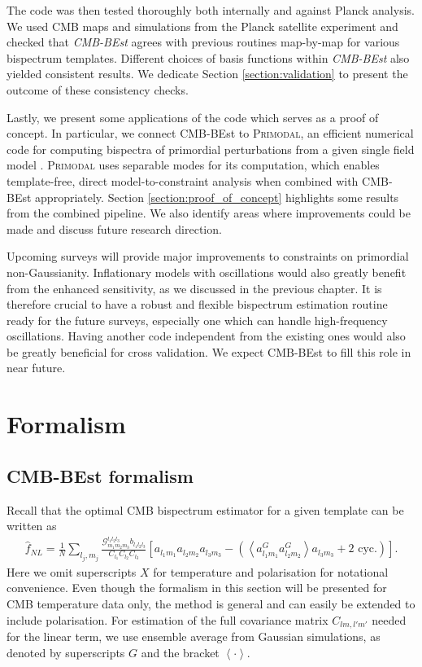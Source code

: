 The code was then tested thoroughly both internally and against Planck analysis. We used CMB maps and simulations from the Planck satellite experiment and checked that \textit{CMB-BEst} agrees with previous routines map-by-map for various bispectrum templates. Different choices of basis functions within \textit{CMB-BEst} also yielded consistent results. We dedicate Section \ref{section:validation} to present the outcome of these consistency checks.

Lastly, we present some applications of the code which serves as a proof of concept. In particular, we connect CMB-BEst to \textsc{Primodal}, an efficient numerical code for computing bispectra of primordial perturbations from a given single field model \cite{Clarke2021}. \textsc{Primodal} uses separable modes for its computation, which enables template-free, direct model-to-constraint analysis when combined with CMB-BEst appropriately. Section \ref{section:proof_of_concept} highlights some results from the combined pipeline. We also identify areas where improvements could be made and discuss future research direction.

Upcoming surveys will provide major improvements to constraints on primordial non-Gaussianity. Inflationary models with oscillations would also greatly benefit from the enhanced sensitivity, as we discussed in the previous chapter. It is therefore crucial to have a robust and flexible bispectrum estimation routine ready for the future surveys, especially one which can handle high-frequency oscillations. Having another code independent from the existing ones would also be greatly beneficial for cross validation. We expect CMB-BEst to fill this role in near future.


\section{Formalism}

\subsection{CMB-BEst formalism}
Recall that the optimal CMB bispectrum estimator for a given template can be written as
\begin{align}
	\hat{f}_{NL} = \frac{1}{N} \sum_{l_j,m_j} \frac{\mathcal{G}^{l_1 l_2 l_3}_{m_1 m_2 m_3} b_{l_1 l_2 l_3}}{C_{l_1} C_{l_2} C_{l_3}} \left[ a_{l_1 m_1} a_{l_2 m_2} a_{l_3 m_3} - \left( \left< a^G_{l_1 m_1} a^G_{l_2 m_2} \right> a_{l_3 m_3} + \text{2\ cyc.} \right)  \right].		\label{eqn:bispectrum_estimator_standard}
\end{align}
Here we omit superscripts $X$ for temperature and polarisation for notational convenience. Even though the formalism in this section will be presented for CMB temperature data only, the method is general and can easily be extended to include polarisation. For estimation of the full covariance matrix $C_{lm,l'm'}$ needed for the linear term, we use ensemble average from Gaussian simulations, as denoted by superscripts $G$ and the bracket $\left<\cdot\right>$.

